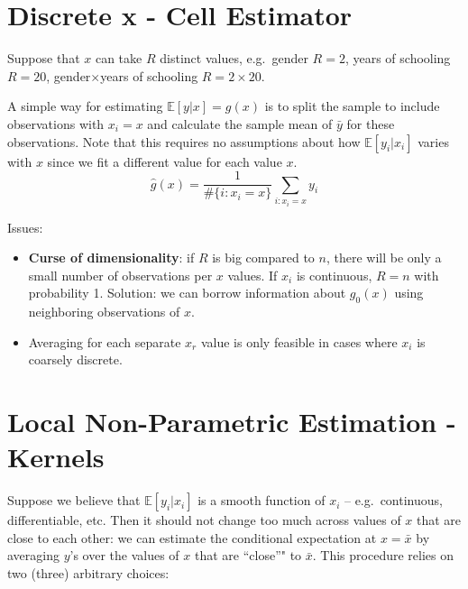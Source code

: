 \documentclass[12pt,]{book}
\providecommand{\tightlist}{%
  \setlength{\itemsep}{0pt}\setlength{\parskip}{0pt}}
\begin{document}
\hypertarget{discrete-x---cell-estimator}{%
\section{Discrete x - Cell Estimator}\label{discrete-x---cell-estimator}}

Suppose that \(x\) can take \(R\) distinct values, e.g.~gender \(R=2\), years of schooling \(R=20\), gender\(\times\)years of schooling \(R = 2\times20\).

A simple way for estimating \(\mathbb E \left[ y |x \right] = g(x)\) is to split the sample to include observations with \(x_i = x\) and calculate the sample mean of \(\bar{y}\) for these observations. Note that this requires no assumptions about how \(\mathbb E [y_i |x_i]\) varies with \(x\) since we fit a different value for each value \(x\).
\[
    \hat{g}(x) = \frac{1}{\# \{ i: x_i = x \}} \sum_{i : x_i = x} y_i 
\]

Issues:

\begin{itemize}
\tightlist
\item
  \textbf{Curse of dimensionality}: if \(R\) is big compared to \(n\), there will be only a small number of observations per \(x\) values. If \(x_i\) is continuous, \(R=n\) with probability 1. Solution: we can borrow information about \(g_0(x)\) using neighboring observations of \(x\).
\item
  Averaging for each separate \(x_r\) value is only feasible in cases where \(x_i\) is coarsely discrete.
\end{itemize}

\hypertarget{local-non-parametric-estimation---kernels}{%
\section{Local Non-Parametric Estimation - Kernels}\label{local-non-parametric-estimation---kernels}}

Suppose we believe that \(\mathbb E [y_i |x_i]\) is a smooth function of \(x_i\) -- e.g.~continuous, differentiable, etc. Then it should not change too much across values of \(x\) that are close to each other: we can estimate the conditional expectation at \(x = \bar{x}\) by averaging \(y\)'s over the values of \(x\) that are ``close''" to \(\bar{x}\). This procedure relies on two (three) arbitrary choices:
\end{document}

